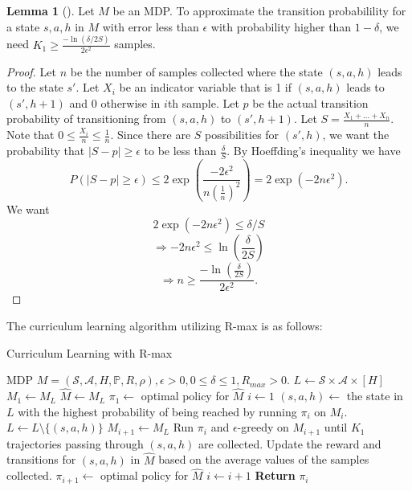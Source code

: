 \documentclass[12pt, letterpaper]{article}
\theoremstyle{definition}
\newtheorem*{lemma}{Lemma}
\theoremstyle{remark}
\begin{document}
\begin{lemma}[]
    Let \(M\) be an MDP. To approximate the transition probabilility for a state \(s, a, h\) in \(M\) with error less than \(\epsilon\) with probability higher than \(1 - \delta\), we need \(K_1 \geq \frac{-\ln(\delta/2S)}{2\epsilon^2}\) samples.
\end{lemma}

\begin{proof}[Proof]
    Let \(n\) be the number of samples collected where the state \((s, a, h)\) leads to the state \(s'\). Let \(X_i\) be an indicator variable that is 1 if \((s, a, h)\) leads to \((s', h+1)\) and 0 otherwise in \(i\)th sample. Let \(p\) be the actual transition probability of transitioning from \((s, a, h)\) to \((s', h+1)\). Let \(S = \frac{X_1 + \ldots + X_{n}}{n}\). Note that \(0 \leq \frac{X_i}{n} \leq \frac{1}{n}\). Since there are \(S\) possibilities for \((s', h)\), we want the probability that \(|S - p| \geq \epsilon\) to be less than \(\frac{\delta}{S}\). By Hoeffding's inequality we have
    \[P(|S - p| \geq \epsilon) \leq 2 \exp (\frac{-2\epsilon^{2}}{n(\frac{1}{n})^2}) = 2 \exp(-2n\epsilon^2).\]
    We want
    \[2 \exp(-2n\epsilon^2) \leq \delta/S\]
    \[\Rightarrow -2n\epsilon^2 \leq \ln(\frac{\delta}{2S})\]
    \[\Rightarrow n \geq \frac{-\ln(\frac{\delta}{2S})}{2\epsilon^2}.\]
\end{proof}



The curriculum learning algorithm utilizing R-max is as follows:

\begin{algorithm}[H]
    \caption{Curriculum Learning with R-max}
\begin{algorithmic}[1]
    \Require MDP \(M = (\mathcal{S}, \mathcal{A}, H, \mathbb{P}, R, \rho), \epsilon > 0, 0 \leq\delta \leq 1, R_{max} > 0\).
        \State $L \gets \mathcal{S} \times \mathcal{A} \times [H]$
        \State $M_{1} \gets M_L$
        \State \(\hat{M} \gets M_L\)
        \State $\pi_{1} \gets$ optimal policy for \(\hat{M}\)
        \State $i \gets 1$
            \State $(s, a, h) \gets$ the state in \(L\) with the highest probability of being reached by running \(\pi_{i}\) on \(M_i\).
            \State \(L \gets L \setminus \{(s, a, h)\}\)
            \State $M_{i+1} \gets M_L$
            \State Run \(\pi_i\) and \(\epsilon\)-greedy on \(M_{i+1}\) until \(K_1\) trajectories passing through \((s, a, h)\) are collected.
            \State Update the reward and transitions for \((s, a, h)\) in \(\hat{M}\) based on the average values of the samples collected.
            \State \(\pi_{i+1} \gets\) optimal policy for \(\hat{M}\)
            \State \(i \gets i+1\)
        \EndWhile
        \State \textbf{Return} \(\pi_i\)

    \EndProcedure
\end{algorithmic}
\end{algorithm}
\end{document}
